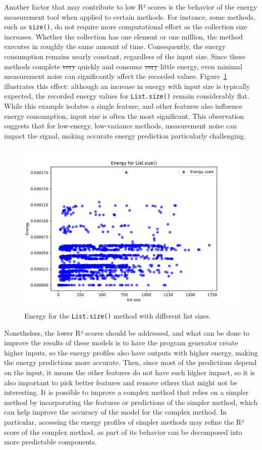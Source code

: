 Another factor that may contribute to low R² scores is the behavior of the energy measurement tool when applied to certain methods. For instance, some methods, such as \texttt{size()}, do not require more computational effort as the collection size increases. Whether the collection has one element or one million, the method executes in roughly the same amount of time. Consequently, the energy consumption remains nearly constant, regardless of the input size. Since these methods complete \st{very} quickly and consume \st{very} little energy, even minimal measurement noise can significantly affect the recorded values. Figure~\ref{fig:size_energy} illustrates this effect: although an increase in energy with input size is typically expected, the recorded energy values for \texttt{List.size()} remain considerably flat. While this example isolates a single feature, and other features also influence energy consumption, input size is often the most significant. This observation suggests that for low-energy, low-variance methods, measurement noise can impact the signal, making accurate energy prediction particularly challenging.

\begin{figure}[htbp]
  \centering
  \includegraphics[width = .8 \textwidth]{figures/size_energy.pdf}
  \caption{Energy for the \texttt{List.size()} method with different list sizes.}
  \label{fig:size_energy}
\end{figure}


Nonetheless, the lower R² scores should be addressed, and what can be done to improve the results of these models is to have the program generator create higher inputs, so the energy profiles also have outputs with higher energy, making the energy predictions more accurate. Then, since most of the predictions depend on the input, it means the other features do not have such higher impact, so it is also important to pick better features and remove others that might not be interesting. {\color{blue}It is possible to improve a complex method that relies on a simpler method by incorporating the features or predictions of the simpler method, which can help improve the accuracy of the model for the complex method. In particular, accessing the energy profiles of simpler methods may refine the R² score of the complex method, as part of its behavior can be decomposed into more predictable components.}



